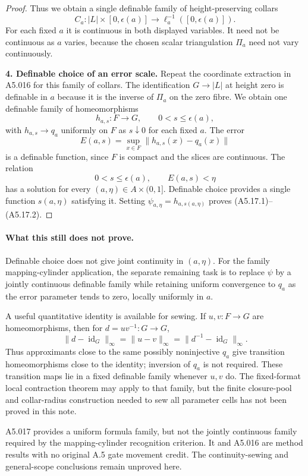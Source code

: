 \begin{proof}
Thus we obtain a single definable family of height-preserving collars
\[
 C_a:|L|\times[0,\epsilon(a)]
       \longrightarrow\ell_a^{-1}([0,\epsilon(a)]).
\]
For each fixed $a$ it is continuous in both displayed variables. It need
not be continuous as $a$ varies, because the chosen scalar triangulation
$\Pi_a$ need not vary continuously.

\medskip\noindent\textbf{4. Definable choice of an error scale.}
Repeat the coordinate extraction in A5.016 for this family of collars.
The identification $G\to|L|$ at height zero is definable in $a$ because
it is the inverse of $\Pi_a$ on the zero fibre. We obtain one definable
family of homeomorphisms
\[
 h_{a,s}:F\longrightarrow G,
 \qquad 0<s\le\epsilon(a),
\]
with $h_{a,s}\to q_a$ uniformly on $F$ as $s\downarrow0$ for each fixed
$a$. The error
\[
 E(a,s)=\sup_{x\in F}\|h_{a,s}(x)-q_a(x)\|
\]
is a definable function, since $F$ is compact and the slices are
continuous. The relation
\[
 0<s\le\epsilon(a),\qquad E(a,s)<\eta
\]
has a solution for every $(a,\eta)\in A\times(0,1]$. Definable choice
provides a single function $s(a,\eta)$ satisfying it. Setting
$\psi_{a,\eta}=h_{a,s(a,\eta)}$ proves (A5.17.1)--(A5.17.2).
\end{proof}

\paragraph{What this still does not prove.}
Definable choice does not give joint continuity in $(a,\eta)$. For the
family mapping-cylinder application, the separate remaining task is to
replace $\psi$ by a jointly continuous definable family while retaining
uniform convergence to $q_a$ as the error parameter tends to zero,
locally uniformly in $a$.

A useful quantitative identity is available for sewing. If
$u,v:F\to G$ are homeomorphisms, then for $d=uv^{-1}:G\to G$,
\[
 \|d-\operatorname{id}_G\|_\infty
   =\|u-v\|_\infty
   =\|d^{-1}-\operatorname{id}_G\|_\infty.
 \tag{A5.17.5}
\]
Thus approximants close to the same possibly noninjective $q_a$ give
transition homeomorphisms close to the identity; inversion of $q_a$ is
not required. These transition maps lie in a fixed definable family
whenever $u,v$ do. The fixed-format local contraction theorem may apply
to that family, but the finite closure-pool and collar-radius construction
needed to sew all parameter cells has not been proved in this note.

A5.017 provides a uniform formula family, but not the jointly continuous
family required by the mapping-cylinder recognition criterion. It and
A5.016 are method results with no original A.5 gate movement credit.
The continuity-sewing and general-scope conclusions remain unproved here.
